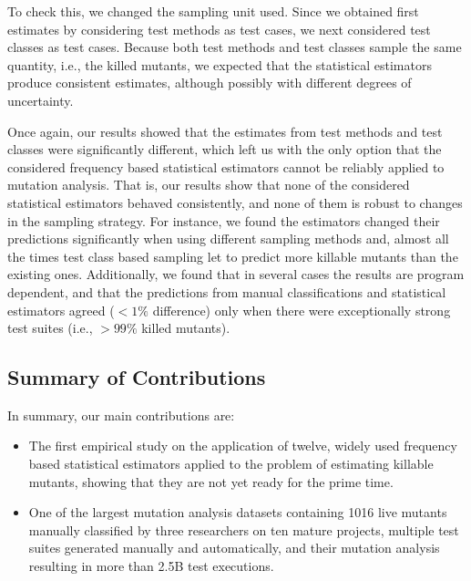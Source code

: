 \documentclass[sigconf,review,anonymous]{acmart}
\newcommand{\estimatorCount}{twelve\xspace}
\begin{document}
To check this, we changed the sampling unit used.
Since we obtained first estimates by
considering test methods as test cases, we next
considered test classes as test cases.
Because both test methods and test classes sample the same quantity, i.e., the killed mutants,
we expected that the statistical estimators produce consistent estimates, although
possibly with different degrees of uncertainty.

Once again, our results showed that the estimates from test methods and test classes were
significantly different, which left us with the only option that the considered frequency based statistical
estimators cannot be reliably applied to mutation analysis.
%
That is, our results show that none of the considered statistical estimators
behaved consistently, and none of them is %
robust to changes in the sampling strategy.
For instance, we found the estimators changed their predictions significantly
when using different sampling methods and, almost all the times %
test class based sampling let to predict more killable mutants than the existing ones.
%
Additionally, we found that in several cases the results are program dependent,
and that the predictions from manual classifications and
statistical estimators agreed ($<1\%$ difference) only when there were
exceptionally strong test suites (i.e., $>99\%$ killed mutants).

\subsection{Summary of Contributions}
In summary, our main contributions are:
\begin{itemize}
   \item The first empirical study on the application of \estimatorCount,
         widely used frequency based statistical %
         estimators applied to the problem of estimating killable mutants,
         showing that they are not yet ready for the prime time.
   \item One of the largest %
mutation analysis datasets containing 1016 live mutants manually
classified by three researchers on ten mature projects,
multiple test suites generated manually and automatically,
and their mutation analysis resulting in more than 2.5B test executions.
\end{itemize}
\end{document}
